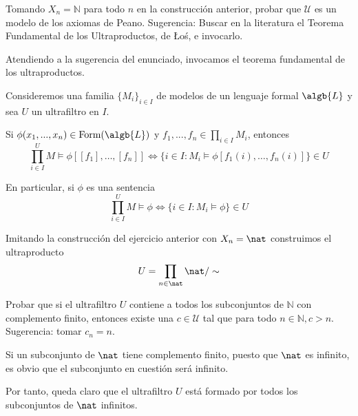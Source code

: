 \begin{problem}
Tomando $X_n = \mathbb{N}$ para todo $n$ en la construcción anterior, probar que $\mathcal{U}$ es un modelo de los axiomas de Peano. Sugerencia: Buscar en la literatura el Teorema Fundamental de los Ultraproductos, de {\L}o\'s, e invocarlo.

\solution

Atendiendo a la sugerencia del enunciado, invocamos el teorema fundamental de los ultraproductos.

\begin{theorem}
Consideremos una familia $\{M_i\}_{i\in I}$ de modelos de un lenguaje formal $\algb{L}$ y sea $U$ un ultrafiltro en $I$.

Si $\phi(x_1,...,x_n) \in \text{Form}(\algb{L})$ y $f_1,...,f_n \in \prod_{i \in I} M_i$, entonces
\[\prod_{i\in I}^U M \models \phi[[f_1], \ldots, [f_n]] \iff \{ i \in I : M_{i} \models \phi[f_1(i), \ldots, f_n(i) ] \} \in U\]

En particular, si $\phi$ es una sentencia
\[\prod_{i\in I}^U M \models \phi \iff \{ i \in I : M_i \models \phi\} \in U\]
\end{theorem}

Imitando la construcción del ejercicio anterior con $X_n = \nat$ construimos el ultraproducto
\[U = \prod_{n \in \nat}\nat/\sim\]

\end{problem}

\begin{problem}
Probar que si el ultrafiltro $U$ contiene a todos los subconjuntos de $\mathbb{N}$ con complemento finito, entonces
existe una $c\in \mathcal{U}$ tal que para todo $n\in \mathbb{N}, c>n$. Sugerencia: tomar $c_n = n$.

\solution

Si un subconjunto de $\nat$ tiene complemento finito, puesto que $\nat$ es infinito, es obvio que el subconjunto en cuestión será infinito.

Por tanto, queda claro que el ultrafiltro $U$ está formado por todos los subconjuntos de $\nat$ infinitos.

\end{problem}

